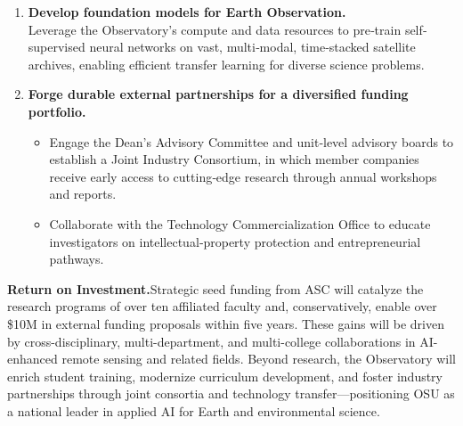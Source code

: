 \documentclass{article}
\begin{document}
\begin{enumerate}[label=\arabic*.]
\item \textbf{Develop foundation models for Earth Observation.}\\
Leverage the Observatory's compute and data resources to pre‐train self‐supervised neural networks on vast, multi‐modal, time‐stacked satellite archives, enabling efficient transfer learning for diverse science problems.

\item \textbf{Forge durable external partnerships for a diversified funding portfolio.}
\begin{itemize}[leftmargin=*]
\item Engage the Dean’s Advisory Committee and unit‐level advisory boards to establish a Joint Industry Consortium, in which member companies receive early access to cutting‐edge research through annual workshops and reports.
\item Collaborate with the Technology Commercialization Office to educate investigators on intellectual‐property protection and entrepreneurial pathways.
\end{itemize}
\end{enumerate}

\vspace{0.5em}
\noindent

\textbf{Return on Investment.}\;Strategic seed funding from ASC will catalyze the research programs of over ten affiliated faculty and, conservatively, enable over \$10M in external funding proposals within five years. These gains will be driven by cross-disciplinary, multi-department, and multi-college collaborations in AI-enhanced remote sensing and related fields. Beyond research, the Observatory will enrich student training, modernize curriculum development, and foster industry partnerships through joint consortia and technology transfer—positioning OSU as a national leader in applied AI for Earth and environmental science.
\end{document}
